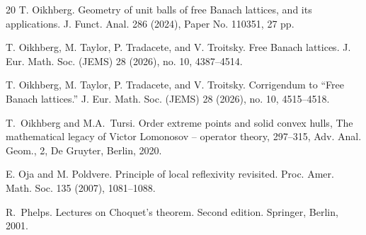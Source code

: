 \documentclass{amsart}
\theoremstyle{plain}
\theoremstyle{definition}
\numberwithin{equation}{section}
\begin{document}
\begin{thebibliography}{20}
 T. Oikhberg. 
Geometry of unit balls of free Banach lattices, and its applications.
J. Funct. Anal. 286 (2024), %
Paper No. 110351, 27 pp.

 T. Oikhberg, M. Taylor, P. Tradacete, and V. Troitsky. Free Banach lattices. J. Eur. Math. Soc. (JEMS) 28 (2026), no. 10, 4387--4514.

 T. Oikhberg, M. Taylor, P. Tradacete, and V. Troitsky. Corrigendum to ``Free Banach lattices.'' J. Eur. Math. Soc. (JEMS) 28 (2026), no. 10, 4515--4518.

 T.~Oikhberg and M.A.~Tursi.
Order extreme points and solid convex hulls, The mathematical legacy of Victor Lomonosov -- operator theory, 297--315, Adv. Anal. Geom., 2, De Gruyter, Berlin, 2020. 

 E. Oja and M. Poldvere.
Principle of local reflexivity revisited.
Proc. Amer. Math. Soc. 135 (2007), 1081--1088. 


 R.~Phelps.
Lectures on Choquet's theorem. Second edition.
Springer, Berlin, 2001. %







\end{thebibliography}
\end{document}
